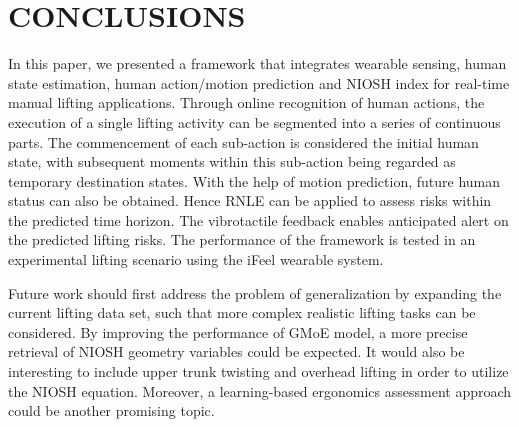 
\section{CONCLUSIONS}
\label{sec:conclusions}
In this paper, we presented a framework that integrates wearable sensing, human state estimation, human action/motion prediction and NIOSH index for real-time manual lifting applications. Through online recognition of human actions, the execution of a single lifting activity can be segmented into a series of continuous parts. The commencement of each sub-action is considered the initial human state, with subsequent moments within this sub-action being regarded as temporary destination states. With the help of motion prediction, future human status can also be obtained. Hence RNLE can be applied to assess risks within the predicted time horizon. The vibrotactile feedback enables anticipated alert on the predicted lifting risks. The performance of the framework is tested in an experimental lifting scenario using the iFeel wearable system.

Future work should first address the problem of generalization by expanding the current lifting data set, such that more complex realistic lifting tasks can be considered. By improving the performance of GMoE model, a more precise retrieval of NIOSH geometry variables could be expected. It would also be interesting to include upper trunk twisting and overhead lifting in order to utilize the NIOSH equation. Moreover, a learning-based ergonomics assessment approach could be another promising topic.  